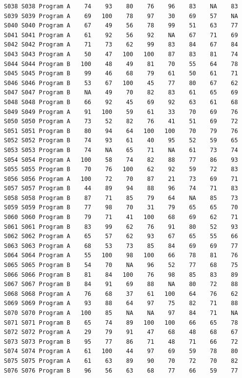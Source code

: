 \documentclass[
  letterpaper,
  DIV=11,
  numbers=noendperiod]{scrreprt}
\begin{document}
\begin{verbatim}
S038 S038 Program A    74    93    80    76    96    83    NA    83
S039 S039 Program A    69   100    78    97    30    69    57    NA
S040 S040 Program A    67    49    56    78    99    51    63    77
S041 S041 Program A    61    92    56    92    NA    67    71    69
S042 S042 Program A    71    73    62    99    83    84    67    84
S043 S043 Program A    50    47   100   100    87    83    81    74
S044 S044 Program B   100    48    49    81    70    55    64    78
S045 S045 Program B    99    46    68    79    61    50    61    71
S046 S046 Program B    53    67   100    45    77    80    67    62
S047 S047 Program B    NA    49    70    82    83    61    65    69
S048 S048 Program B    66    92    45    69    92    63    61    68
S049 S049 Program A    91   100    59    61    33    70    69    76
S050 S050 Program A    73    52    82    76    41    51    69    72
S051 S051 Program B    80    94    64   100   100    70    79    76
S052 S052 Program B    74    93    61    40    95    52    59    65
S053 S053 Program B    74    NA    65    71    NA    61    73    74
S054 S054 Program A   100    58    74    82    88    77    86    93
S055 S055 Program B    70    76   100    62    92    59    72    83
S056 S056 Program A   100    72    70    87    21    73    69    71
S057 S057 Program B    44    89    94    88    96    74    71    83
S058 S058 Program B    87    71    85    79    64    NA    85    73
S059 S059 Program B    77    98    70    31    79    65    65    70
S060 S060 Program B    79    71    41   100    68    69    62    71
S061 S061 Program B    83    99    62    76    91    80    52    93
S062 S062 Program A    65    57    62    93    67    65    55    66
S063 S063 Program A    68    53    73    85    84    69    69    77
S064 S064 Program A    55   100    98   100    66    78    81    76
S065 S065 Program B    54    70    NA    96    52    77    68    75
S066 S066 Program B    81    84   100    76    98    85    83    89
S067 S067 Program B    84    91    69    88    NA    80    72    88
S068 S068 Program A    76    68    37    61   100    64    76    62
S069 S069 Program A    93    88    64    97    75    82    71    88
S070 S070 Program A   100    85    NA    NA    97    84    71    NA
S071 S071 Program B    65    74    89   100   100    66    65    78
S072 S072 Program A    29    79    91    47    68    48    68    67
S073 S073 Program B    95    77    86    71    48    71    66    72
S074 S074 Program A    61   100    44    97    69    59    78    80
S075 S075 Program A    61    63    89    90    70    72    70    82
S076 S076 Program B    96    56    63    68    77    66    59    77

\end{verbatim}
\end{document}
